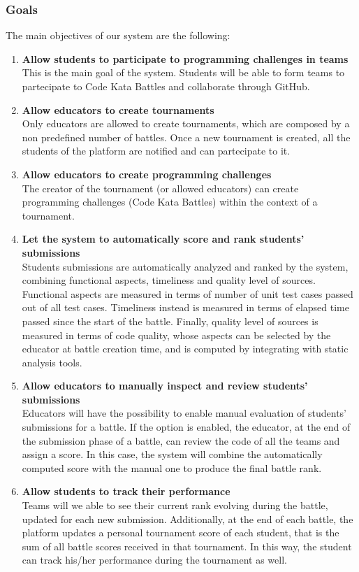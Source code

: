  \subsubsection{Goals}
 \label{goals}
 The main objectives of our system are the following:
 \begin{enumerate}[label=$\bullet$ \textbf{G\arabic*:}]
     \item \textbf{ Allow students to participate to programming challenges in teams}\\This is the main goal of the system. Students will be able to form teams to partecipate to Code Kata Battles and collaborate through GitHub.
     \item \textbf { Allow educators to create tournaments}\\Only educators are allowed to create tournaments, which are composed by a non predefined number of battles. Once a new tournament is created, all the students of the platform are notified and can partecipate to it.
     \item \textbf{ Allow educators to create programming challenges}\\The creator of the tournament (or allowed educators) can create programming challenges (Code Kata Battles) within the context of a tournament.
     \item \textbf{ Let the system to automatically score and rank students’ submissions}\\Students submissions are automatically analyzed and ranked by the system, combining functional aspects, timeliness and quality level of sources. Functional aspects are measured in terms of number of unit test cases passed out of all test cases. Timeliness instead is measured in terms of elapsed time passed since the start of the battle. Finally, quality level of sources is measured in terms of code quality, whose aspects can be selected by the educator at battle creation time, and is computed by integrating with static analysis tools.
     \item \textbf{ Allow educators to manually inspect and review students’ submissions}\\Educators will have the possibility to enable manual evaluation of students' submissions for a battle. If the option is enabled, the educator, at the end of the submission phase of a battle, can review the code of all the teams and assign a score. In this case, the system will combine the automatically computed score with the manual one to produce the final battle rank.
     \item \textbf{ Allow students to track their performance}\\Teams will we able to see their current rank evolving during the battle, updated for each new submission. Additionally, at the end of each battle, the platform updates a personal tournament score of each student, that is the sum of all battle scores received in that tournament. In this way, the student can track his/her performance during the tournament as well.
 \end{enumerate}

